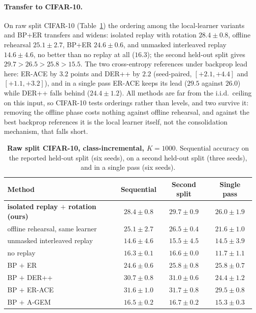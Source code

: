 \documentclass{article}
\begin{document}
\paragraph{Transfer to CIFAR-10.} On raw split CIFAR-10 (Table~\ref{tab:cifar}) the ordering
among the local-learner variants and BP+ER transfers and widens: isolated replay with rotation
$28.4\pm0.8$, offline rehearsal $25.1\pm2.7$, BP+ER $24.6\pm0.6$, and unmasked interleaved
replay $14.6\pm4.6$, no better than no replay at all ($16.3$); the second held-out split gives
$29.7>26.5>25.8>15.5$. The two cross-entropy references under backprop lead here: ER-ACE by
$3.2$ points and DER++ by $2.2$ (seed-paired, $[+2.1,+4.4]$ and $[+1.1,+3.2]$), and in a
single pass ER-ACE keeps its lead ($29.5$ against $26.0$) while DER++ falls behind
($24.4\pm1.2$). All methods are far from the i.i.d.\ ceiling on this input, so CIFAR-10 tests
orderings rather than levels, and two survive it: removing the offline phase costs nothing
against offline rehearsal, and against the best backprop references it is the local learner
itself, not the consolidation mechanism, that falls short.

\begin{table}[t]
\centering\footnotesize
\caption{\textbf{Raw split CIFAR-10, class-incremental, $K{=}1000$}. Sequential accuracy on
the reported held-out split (six seeds), on a second held-out split (three seeds), and in a
single pass (six seeds).}
\label{tab:cifar}
\begin{tabular}{@{}lccc@{}}
\toprule
Method & Sequential & Second split & Single pass \\
\midrule
\textbf{isolated replay $+$ rotation (ours)} & $28.4\pm0.8$ & $29.7\pm0.9$ & $26.0\pm1.9$ \\
offline rehearsal, same learner & $25.1\pm2.7$ & $26.5\pm0.4$ & $21.6\pm1.0$ \\
unmasked interleaved replay & $14.6\pm4.6$ & $15.5\pm4.5$ & $14.5\pm3.9$ \\
no replay & $16.3\pm0.1$ & $16.6\pm0.0$ & $11.7\pm1.1$ \\
BP $+$ ER & $24.6\pm0.6$ & $25.8\pm0.8$ & $25.8\pm0.7$ \\
BP $+$ DER++ & $30.7\pm0.8$ & $31.0\pm0.6$ & $24.4\pm1.2$ \\
BP $+$ ER-ACE & $\mathbf{31.6\pm1.0}$ & $\mathbf{31.7\pm0.8}$ & $\mathbf{29.5\pm0.8}$ \\
BP $+$ A-GEM & $16.5\pm0.2$ & $16.7\pm0.2$ & $15.3\pm0.3$ \\
\bottomrule
\end{tabular}
\end{table}
\end{document}
